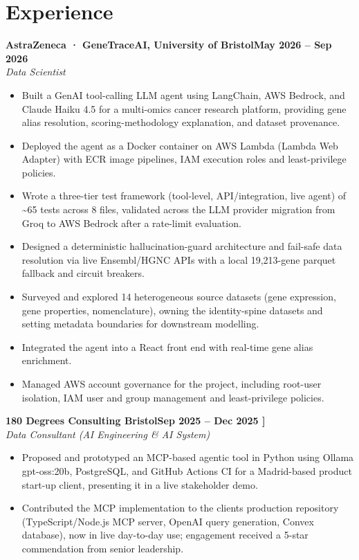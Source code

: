 \documentclass[a4paper,11pt]{article}
\newcommand{\entry}[4]{\needspace{4\baselineskip}\noindent\textbf{#1}\hfill\textbf{#2}\\ \textit{#3}\hfill\textit{#4}\par}
\begin{document}
\section{Experience}
\entry{AstraZeneca · GeneTraceAI, University of Bristol}{May 2026 – Sep 2026}{Data Scientist}{}
\begin{itemize}
  \item Built a GenAI tool-calling LLM agent using LangChain, AWS Bedrock, and Claude Haiku 4.5 for a multi-omics cancer research platform, providing gene alias resolution, scoring-methodology explanation, and dataset provenance.
  \item Deployed the agent as a Docker container on AWS Lambda (Lambda Web Adapter) with ECR image pipelines, IAM execution roles and least-privilege policies.
  \item Wrote a three-tier test framework (tool-level, API/integration, live agent) of \textasciitilde{}65 tests across 8 files, validated across the LLM provider migration from Groq to AWS Bedrock after a rate-limit evaluation.
  \item Designed a deterministic hallucination-guard architecture and fail-safe data resolution via live Ensembl/HGNC APIs with a local 19,213-gene parquet fallback and circuit breakers.
  \item Surveyed and explored 14 heterogeneous source datasets (gene expression, gene properties, nomenclature), owning the identity-spine datasets and setting metadata boundaries for downstream modelling.
  \item Integrated the agent into a React front end with real-time gene alias enrichment.
  \item Managed AWS account governance for the project, including root-user isolation, IAM user and group management and least-privilege policies.
\end{itemize}
\vspace{4pt}
\entry{180 Degrees Consulting Bristol}{Sep 2025 – Dec 2025   ]}{Data Consultant (AI Engineering \& AI System)}{}
\begin{itemize}
  \item Proposed and prototyped an MCP-based agentic tool in Python using Ollama gpt-oss:20b, PostgreSQL, and GitHub Actions CI for a Madrid-based product start-up client, presenting it in a live stakeholder demo.
  \item Contributed the MCP implementation to the client\textquotesingle{}s production repository (TypeScript/Node.js MCP server, OpenAI query generation, Convex database), now in live day-to-day use; engagement received a 5-star commendation from senior leadership.
\end{itemize}
\end{document}
